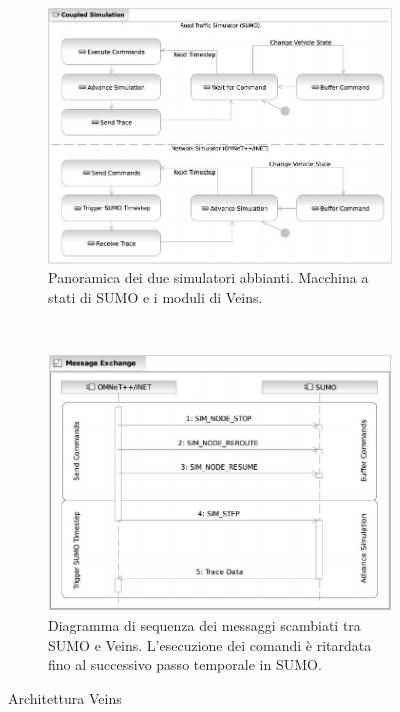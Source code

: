 \begin{figure}[H]
        \centering
        \begin{subfigure}[H]{0.5\textwidth}
                \includegraphics[width=\textwidth]{assets/veins-state-machine.jpg}
                \caption{Panoramica dei due simulatori abbianti. Macchina a stati di SUMO e i moduli di Veins.}
                \label{fig:veins-state-machine}
        \end{subfigure}%
        ~ %
        \begin{subfigure}[H]{0.5\textwidth}
                \includegraphics[width=\textwidth]{assets/veins-sequence-diagram.jpg}
                \caption{ Diagramma di sequenza dei messaggi scambiati tra SUMO e Veins. L'esecuzione dei comandi è ritardata fino al successivo passo temporale in SUMO.}
                \label{fig:veins-sequence-diagram}
        \end{subfigure}
        \caption{Architettura Veins}
\end{figure}


